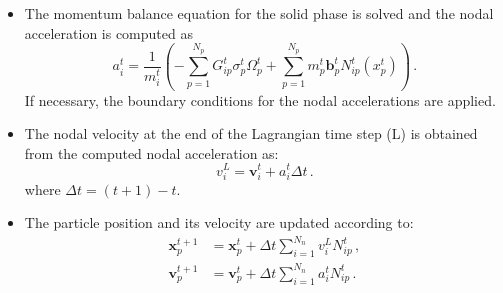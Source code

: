 \begin{itemize}
\item
The momentum balance equation for the solid phase is solved and the nodal 
acceleration is computed as
\begin{equation}
\mathbf{\mathit{a}}_i^t = \frac{1}{m_i^t} \left( - \sum\limits_{p = 
1}^{N_p}{G}_{ip}^t \sigma_p^t \Omega_p^t + \sum\limits_{p = 
1}^{N_p}m_p^t \mathbf{b}_p^t N_{ip}^t(x^t_p)  \right) \,.
\end{equation}
If necessary, the boundary conditions for the nodal accelerations are applied.


\item
The nodal velocity at the end of the Lagrangian time step (L) is obtained from 
the computed nodal acceleration as:
\begin{equation}
\mathbf{\mathit{v}}_{\mathit{i}}^{L} = 
\mathit{\mathbf{v}}_{\mathit{i}}^{\mathit{t}} + 
\mathbf{\mathit{a}}_{\mathit{i}}^{\mathit{t}} \Delta \mathit{t} \,.
\end{equation}
where $\Delta t = (t+1) - t$.

\item
The particle position and its velocity are updated according to:
\begin{align}
\nonumber
\mathbf{x}_{\mathit{p}}^{\mathit{t}+1} &  = 
\mathbf{x}_{\mathit{p}}^{\mathit{t}} + 
\Delta \mathit{t} \sum\limits_{\mathit{i}=1}^{\mathit{N}_{n}} 
\mathbf{\mathit{v}}_{\mathit{i}}^{L}\mathit{N}_{\mathit{ip}}^{\mathit{t}} \,, \\
\mathbf{v}_{\mathit{p}}^{\mathit{t}+1} & = \mathbf{v}_{\mathit{p}}^{\mathit{t}} 
+ 
\Delta \mathit{t} \sum\limits_{\mathit{i}=1}^{\mathit{N}_{n}} 
\mathbf{\mathit{a}}_{\mathit{i}}^{t}\mathit{N}_{\mathit{ip}}^{\mathit{t}} \,.
\end{align}



\end{itemize}
